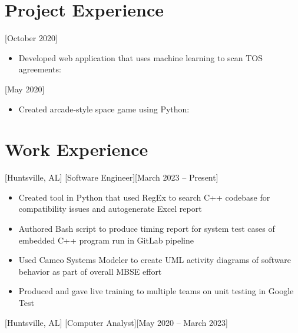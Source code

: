 \documentclass[hidelinks, 11pt]{article}
\begin{document}
\section{Project Experience}

[October 2020]

\begin{itemize}
	\item Developed web application that uses machine learning to scan TOS agreements: 
\end{itemize}

[May 2020]

\begin{itemize}
	\item Created arcade-style space game using Python: 
\end{itemize}

\section{Work Experience}

[Huntsville, AL]
[Software Engineer][March 2023 -- Present]

\begin{itemize}
	\item Created tool in Python that used RegEx to search C++ codebase for compatibility issues and autogenerate Excel report
	\item Authored Bash script to produce timing report for system test cases of embedded C++ program run in GitLab pipeline
	\item Used Cameo Systems Modeler to create UML activity diagrams of software behavior as part of overall MBSE effort
	\item Produced and gave live training to multiple teams on unit testing in Google Test
\end{itemize}

[Huntsville, AL]
[Computer Analyst][May 2020 -- March 2023]
\end{document}
